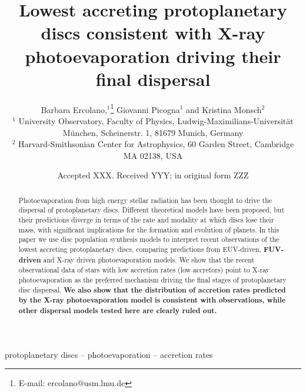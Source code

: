 \documentclass[fleqn,usenatbib]{mnras}
\title[Low accretors and disc dispersal]{Lowest accreting protoplanetary discs consistent with X-ray photoevaporation driving their final dispersal}
\author[B. Ercolano et al.]{
Barbara Ercolano,$^{1}$\thanks{E-mail: ercolano@usm.lmu.de}
Giovanni Picogna$^{1}$
and Kristina Monsch$^{2}$
\\
$^{1}$ University Observatory, Faculty of Physics, Ludwig-Maximilians-Universit\"at M\"unchen, Scheinerstr. 1, 81679 Munich, Germany\\
$^{2}$ Harvard-Smithsonian Center for Astrophysics, 60 Garden Street, Cambridge MA 02138, USA
}
\date{Accepted XXX. Received YYY; in original form ZZZ}
\begin{document}
\label{firstpage}
\pagerange{\pageref{firstpage}--\pageref{lastpage}}
\maketitle

\begin{abstract}

Photoevaporation from high energy stellar radiation has been thought to drive the dispersal of protoplanetary discs. Different theoretical models have been proposed, but their predictions diverge in terms of the rate and modality at which discs lose their mass, with significant implications for the formation and evolution of planets. In this paper we use disc population synthesis models to interpret recent observations of the lowest accreting protoplanetary discs, comparing predictions from EUV-driven, \textbf{FUV-driven} and X-ray driven photoevaporation models. We show that the recent observational data of stars with low accretion rates (low accretors) point to X-ray photoevaporation as the preferred mechanism driving the final stages of protoplanetary disc dispersal. {\bf We also show that the distribution of accretion rates predicted by the X-ray photoevaporation model is consistent with observations, while other dispersal models tested here are clearly ruled out.}

\end{abstract}

\begin{keywords}
protoplanetary discs -- photoevaporation -- accretion rates
\end{keywords}


\end{document}
